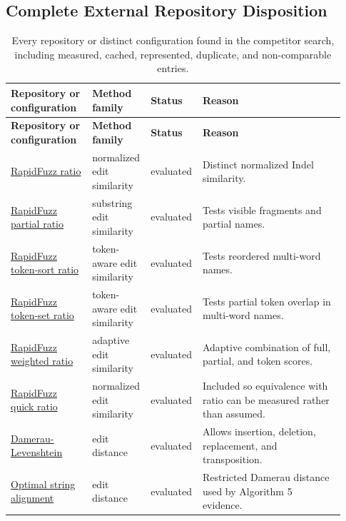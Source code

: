 \begin{landscape}
\subsection{Complete External Repository Disposition}
\begin{scriptsize}
\setlength{\tabcolsep}{1.5pt}
\renewcommand{\arraystretch}{1.05}
\begin{longtable}{@{}L{0.24\linewidth}L{0.15\linewidth}L{0.12\linewidth}L{0.42\linewidth}@{}}
\caption{Every repository or distinct configuration found in the competitor search, including measured, cached, represented, duplicate, and non-comparable entries.}\label{tab:expanded-complete-inventory}\\
\toprule
\textbf{Repository or configuration} & \textbf{Method family} & \textbf{Status} & \textbf{Reason} \\
\midrule
\endfirsthead
\toprule
\textbf{Repository or configuration} & \textbf{Method family} & \textbf{Status} & \textbf{Reason} \\
\midrule
\endhead
\href{https://github.com/rapidfuzz/RapidFuzz}{RapidFuzz ratio} & normalized edit similarity & evaluated & Distinct normalized Indel similarity. \\
\href{https://github.com/rapidfuzz/RapidFuzz}{RapidFuzz partial ratio} & substring edit similarity & evaluated & Tests visible fragments and partial names. \\
\href{https://github.com/rapidfuzz/RapidFuzz}{RapidFuzz token-sort ratio} & token-aware edit similarity & evaluated & Tests reordered multi-word names. \\
\href{https://github.com/rapidfuzz/RapidFuzz}{RapidFuzz token-set ratio} & token-aware edit similarity & evaluated & Tests partial token overlap in multi-word names. \\
\href{https://github.com/rapidfuzz/RapidFuzz}{RapidFuzz weighted ratio} & adaptive edit similarity & evaluated & Adaptive combination of full, partial, and token scores. \\
\href{https://github.com/rapidfuzz/RapidFuzz}{RapidFuzz quick ratio} & normalized edit similarity & evaluated & Included so equivalence with ratio can be measured rather than assumed. \\
\href{https://github.com/rapidfuzz/RapidFuzz}{Damerau-Levenshtein} & edit distance & evaluated & Allows insertion, deletion, replacement, and transposition. \\
\href{https://github.com/rapidfuzz/RapidFuzz}{Optimal string alignment} & edit distance & evaluated & Restricted Damerau distance used by Algorithm 5 evidence. \\

\end{longtable}
\end{scriptsize}
\end{landscape}
